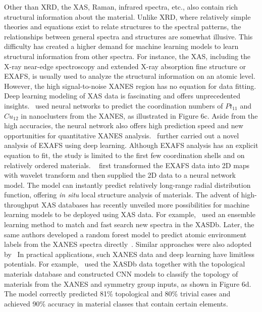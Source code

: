 \documentclass[pdflatex,sn-mathphys]{sn-jnl}%
\theoremstyle{thmstyleone}%
\theoremstyle{thmstyletwo}%
\theoremstyle{thmstylethree}%
\begin{document}
Other than XRD, the XAS, Raman, infrared spectra, etc., also contain rich structural information about the material. Unlike XRD, where relatively simple theories and equations exist to relate structures to the spectral patterns, the relationships between general spectra and structures are somewhat illusive. This difficulty has created a higher demand for machine learning models to learn structural information from other spectra.  For instance, the XAS, including the X-ray near-edge spectroscopy and extended X-ray absorption fine structure or EXAFS, is usually used to analyze the structural information on an atomic level. However, the high signal-to-noise XANES region has no equation for data fitting. Deep learning modeling of XAS data is fascinating and offers unprecedented insights.~\cite{Timoshenko} used neural networks to predict the coordination numbers of $Pt_{11}$ and $Cu_{12}$ in nanoclusters from the XANES, as illustrated in Figure 6c. Aside from the high accuracies, the neural network also offers high prediction speed and new opportunities for quantitative XANES analysis.~\cite{Timoshenko.13} further carried out a novel analysis of EXAFS using deep learning. Although EXAFS analysis has an explicit equation to fit, the study is limited to the first few coordination shells and on relatively ordered materials.  ~\cite{Timoshenko.13} first transformed the EXAFS data into 2D maps with wavelet transform and then supplied the 2D data to a neural network model. The model can instantly predict relatively long-range radial distribution function, offering \emph{in situ} local structure analysis of materials. The advent of high-throughput XAS databases has recently unveiled more possibilities for machine learning models to be deployed using XAS data. For example,~\cite{Zheng.1} used an ensemble learning method to match and fast search new spectra in the XASDb. Later, the same authors developed a random forest model to predict atomic environment labels from the XANES spectra directly~\cite{?}. Similar approaches were also adopted by~\cite{Torrisi.15} In practical applications, such XANES data and deep learning have limitless potentials. For example,~\cite{Andrejevic.16} used the XASDb data together with the topological materials database and constructed CNN models to classify the topology of materials from the XANES and symmetry group inputs, as shown in Figure 6d. The model correctly predicted 81\% topological and 80\% trivial cases and achieved 90\% accuracy in material classes that contain certain elements. 
\end{document}

